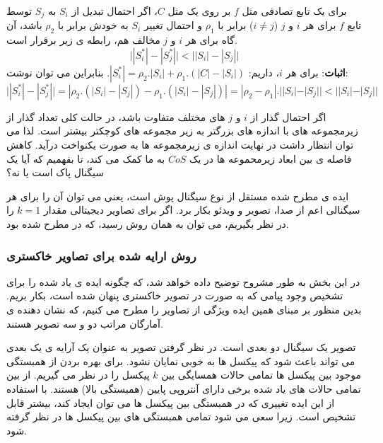 \begin{theorem}
برای یک تابع تصادفی مثل $ f $ بر روی یک  مثل $ C $، اگر احتمال تبدیل از $ S_{i} $ به $ S_{j} $ توسط تابع $ f $ برای هر $ i $ و $ j $ ($ i\neq j $) برابر با $ \rho _{1} $ و احتمال تغییر $ S_{i} $ به خودش برابر با $ \rho _{2} $ باشد، آن گاه برای هر $ i $ و $ j $ مخالف هم، رابطه ی زیر برقرار است.
\begin{equation}
\lvert |S_{i}^{*}|-|S_{j}^{*}| \rvert <\lvert |S_{i}|-|S_{j}| \rvert
\end{equation}
\textbf{اثبات}:
برای هر $ i $، داریم: 
$ |S_{i}^{*}|=\rho _{2}.|S_{i}|+\rho _{1}.(|C|-|S_{i}|)  $.
بنابراین می توان نوشت: 
$ \lvert |S_{i}^{*}|-|S_{j}^{*}| \rvert = |\rho _{2}.(|S_{i}|-|S_{j}|) - \rho _{1}.(|S_{i}|-|S_{j}|)| =|\rho _{2}-\rho _{1}|.||S_{i}|-|S_{j}||<||S_{i}|-|S_{j}||$
\end{theorem}
اگر احتمال گذار از $ i $ و $ j $ های مختلف متفاوت باشد، در حالت کلی تعداد گذار از زیرمجموعه های با اندازه های بزرگتر به زیر مجموعه های کوچکتر بیشتر است. لذا می توان انتظار داشت در نهایت اندازه ی زیرمجموعه ها به صورت یکنواخت درآید. کاهش فاصله ی بین ابعاد زیرمحموعه ها در یک $ CoS $ به ما کمک می کند، تا بفهمیم که آیا یک سیگنال پاک است یا نه؟

ایده ی مطرح شده مستقل از نوع سیگنال پوش است، یعنی می توان آن را برای هر سیگنالی اعم از صدا، تصویر و ویدئو بکار برد. اگر برای تصاویر دیجیتالی مقدار $ k=1 $ را در نظر بگیریم، می توان به همان روش  رسید، که در \cite{Westfeld2000_Attacks} مطرح شده بود. 

\subsubsection{روش ارایه شده برای تصاویر خاکستری}
در این بخش به طور مشروح توضیح داده خواهد شد، که چگونه ایده ی یاد شده را برای تشخیص وجود پیامی که به صورت  در تصویر خاکستری پنهان شده است، بکار بریم. بدین منظور بر مبنای همین ایده ویژگی از تصاویر را مطرح می کنیم، که نشان دهنده ی آمارگان مراتب دو و سه تصویر هستند. 

تصویر یک سیگنال دو بعدی است. در نظر گرفتن تصویر به عنوان یک آرایه ی یک بعدی می تواند باعث شود که {}  پیکسل ها به خوبی نمایان نشود. برای بهره بردن از همبستگی موجود بین پیکسل ها تمامی حالات همسایگی بین $ k $ پیکسل را در نظر می گیریم. از بین تمامی حالات های یاد شده برخی دارای آنتروپی پایین (همبستگی بالا) هستند. با استفاده از این ایده تغییری که  در همبستگی بین پیکسل ها می توان ایجاد کند، بیشتر قابل تشخیص است. زیرا سعی می شود تمامی همبستگی های بین پیکسل ها در نظر گرفته شود. 
 
